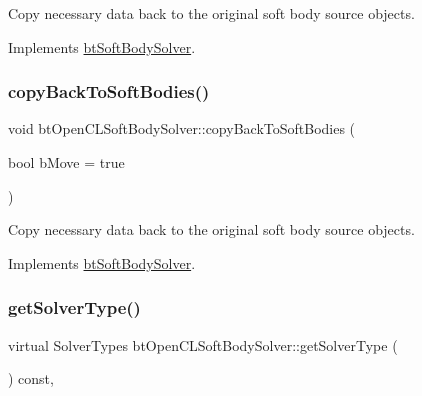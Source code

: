 Copy necessary data back to the original soft body source objects. 

Implements \hyperlink{classbtSoftBodySolver_ac4034ba178cb75bd880a44958eaa38d1}{bt\+Soft\+Body\+Solver}.

\mbox{\label{classbtOpenCLSoftBodySolver_ab5490d39c1bf489ed33d6e6a4582f93b}} 
\subsubsection{\texorpdfstring{copy\+Back\+To\+Soft\+Bodies()}{copyBackToSoftBodies()}\hspace{0.1cm}{\footnotesize\ttfamily [2/2]}}
{\footnotesize\ttfamily void bt\+Open\+C\+L\+Soft\+Body\+Solver\+::copy\+Back\+To\+Soft\+Bodies (\begin{DoxyParamCaption}\item[{bool}]{b\+Move = {\ttfamily true} }\end{DoxyParamCaption})\hspace{0.3cm}{\ttfamily [virtual]}}

Copy necessary data back to the original soft body source objects. 

Implements \hyperlink{classbtSoftBodySolver_ac4034ba178cb75bd880a44958eaa38d1}{bt\+Soft\+Body\+Solver}.

\mbox{\label{classbtOpenCLSoftBodySolver_a2b643547caacc5c1daedff3f67a140fb}} 
\subsubsection{\texorpdfstring{get\+Solver\+Type()}{getSolverType()}\hspace{0.1cm}{\footnotesize\ttfamily [1/2]}}
{\footnotesize\ttfamily virtual Solver\+Types bt\+Open\+C\+L\+Soft\+Body\+Solver\+::get\+Solver\+Type (\begin{DoxyParamCaption}{ }\end{DoxyParamCaption}) const\hspace{0.3cm}{\ttfamily [inline]}, {\ttfamily [virtual]}}

